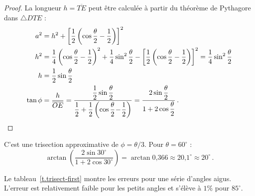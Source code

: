 \begin{proof}
La longueur $h=\overline{TE}$ peut être calculée à partir du théorème de Pythagore dans $\triangle DTE$ :
\begin{align*}
a^2 &= h^2 + \left[\frac{1}{2}\left(\cos \frac{\theta}{2}-\frac{1}{2}\right)\right]^2\\
h^2&=\frac{1}{4}\left(\cos \frac{\theta}{2}-\frac{1}{2}\right)^2+\frac{1}{4}\sin^2\frac{\theta}{2}-\left[\frac{1}{2}\left(\cos \frac{\theta}{2}-\frac{1}{2}\right)\right]^2=
\frac{1}{4}\sin^2\frac{\theta}{2}\\
h&=\frac{1}{2}\sin\frac{\theta}{2}\\
\tan\phi &=\frac{h}{\overline{OE}}=\displaystyle\frac{\displaystyle\frac{1}{2}\sin\frac{\theta}{2}}{\displaystyle\frac{1}{2}+\frac{1}{2}\left(\cos \frac{\theta}{2}\! -\! \frac{1}{2}\right)}
=\frac{\displaystyle2\sin\frac{\theta}{2}}{\displaystyle 1+2\cos\frac{\theta}{2}}\,.\qedhere
\end{align*}                  
\end{proof}

C'est une trisection approximative de $\phi=\theta/3$. Pour $\theta=60^\circ$ :
\[
\arctan\left(\frac{2\sin 30^\circ}{1+2\cos 30^\circ}\right)=
\arctan\mbox{0,366}\approx \mbox{20,1}^\circ\approx 20^\circ\,.
\]

Le tableau~\ref{t.trisect-first} montre les erreurs pour une série d'angles aigus. L'erreur est relativement faible pour les petits angles et s'élève à $1\%$ pour  $85^\circ$.

